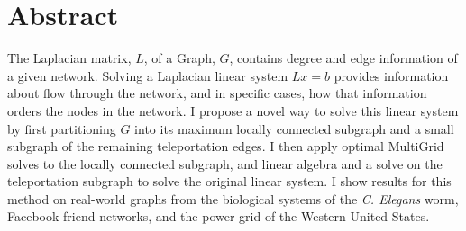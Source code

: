 \documentclass{article}
\begin{document}
\section{Abstract}
The Laplacian matrix, $L$, of a Graph, $G$, contains degree and edge information of a given network. Solving a Laplacian linear system $Lx = b$ provides information about flow through the network, and in specific cases, how that information orders the nodes in the network. I propose a novel way to solve this linear system by first partitioning $G$ into its maximum locally connected subgraph and a small subgraph of the remaining teleportation edges. I then apply optimal MultiGrid solves to the locally connected subgraph, and linear algebra and a solve on the teleportation subgraph to solve the original linear system. I show results for this method on real-world graphs from the biological systems of the \textit{C. Elegans} worm, Facebook friend networks, and the power grid of the Western United States.

%
%
\end{document}
